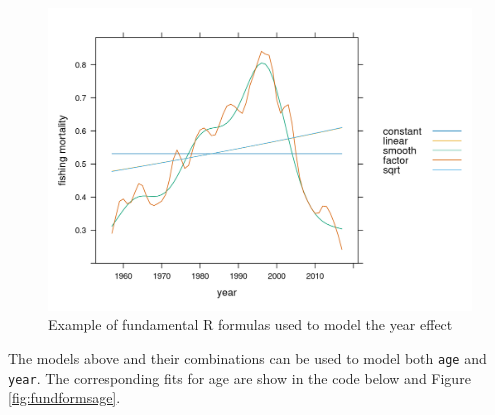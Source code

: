 \documentclass[
]{book}
\begin{document}
\begin{figure}
\centering
\includegraphics{_bookdown_files/_main_files/figure-html/fundforms-1.png}
\caption{\label{fig:fundforms}Example of fundamental R formulas used to model the year effect}
\end{figure}

The models above and their combinations can be used to model both \texttt{age} and \texttt{year}. The corresponding fits for age are show in the code below and Figure \ref{fig:fundformsage}.
\end{document}
